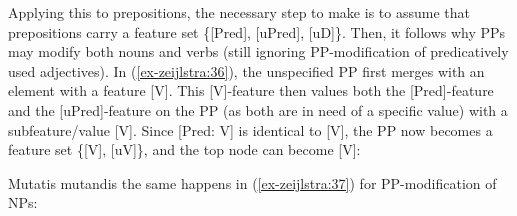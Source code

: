 \documentclass[output=paper
,modfonts
,nonflat]{langsci/langscibook}
\begin{document}
Applying this to prepositions, the necessary step to make is to assume that prepositions carry a feature set \{[Pred], [uPred], [uD]\}. Then, it follows why PPs may modify both nouns and verbs (still ignoring PP-modification of predicatively used adjectives). In (\ref{ex-zeijlstra:36}), the unspecified PP first merges with an element with a feature [V]. This [V]-feature then values both the [Pred]-feature and the [uPred]-feature on the PP (as both are in need of a specific value) with a subfeature/value [V]. Since [Pred: V] is identical to [V], the PP now becomes a feature set \{[V], [uV]\}, and the top node can become [V]:

\begin{figure}[!h]
	\begin{exe}
	\end{exe}\vspace{-0.8cm}
\end{figure}
\newpage\noindent Mutatis mutandis the same happens in (\ref{ex-zeijlstra:37}) for PP-modification of NPs:
\end{document}
